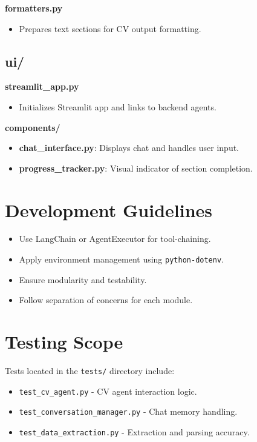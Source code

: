 \documentclass[11pt]{article}
\begin{document}
\textbf{formatters.py}
\begin{itemize}
    \item Prepares text sections for CV output formatting.
\end{itemize}

\subsection{ui/}

\textbf{streamlit\_app.py}
\begin{itemize}
    \item Initializes Streamlit app and links to backend agents.
\end{itemize}

\textbf{components/}
\begin{itemize}
    \item \textbf{chat\_interface.py}: Displays chat and handles user input.
    \item \textbf{progress\_tracker.py}: Visual indicator of section completion.
\end{itemize}

\section{Development Guidelines}
\begin{itemize}
    \item Use LangChain or AgentExecutor for tool-chaining.
    \item Apply environment management using \texttt{python-dotenv}.
    \item Ensure modularity and testability.
    \item Follow separation of concerns for each module.
\end{itemize}

\section{Testing Scope}

Tests located in the \texttt{tests/} directory include:
\begin{itemize}
    \item \texttt{test\_cv\_agent.py} - CV agent interaction logic.
    \item \texttt{test\_conversation\_manager.py} - Chat memory handling.
    \item \texttt{test\_data\_extraction.py} - Extraction and parsing accuracy.
\end{itemize}
\end{document}
